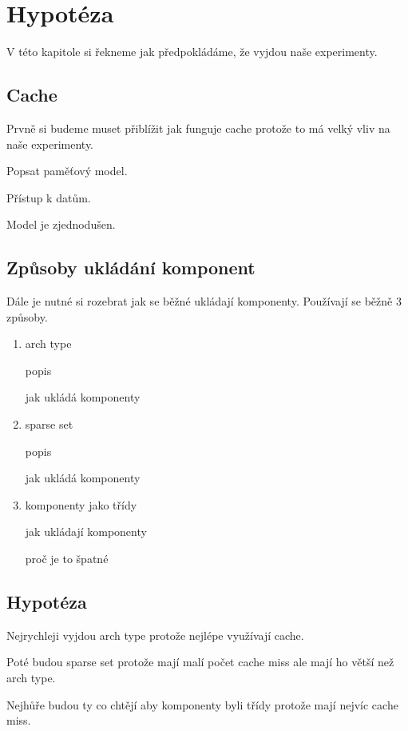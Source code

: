 \chapter{Hypotéza}
\label{chap:hypothesis}
V této kapitole si řekneme jak předpokládáme, že vyjdou naše experimenty.

\section{Cache}
Prvně si budeme muset přiblížit jak funguje cache protože to má velký vliv na naše experimenty.

Popsat paměťový model.

Přístup k datům.

Model je zjednodušen.

\section{Způsoby ukládání komponent}
Dále je nutné si rozebrat jak se běžné ukládají komponenty. Používají se běžně 3 způsoby.

\begin{enumerate}
    \item arch type

    popis

    jak ukládá komponenty
    \item sparse set

    popis

    jak ukládá komponenty

    \item komponenty jako třídy

    jak ukládají komponenty

    proč je to špatné
\end{enumerate}

\section{Hypotéza}
Nejrychleji vyjdou arch type protože nejlépe využívají cache.

Poté budou sparse set protože mají malí počet cache miss ale mají ho větší než arch type.

Nejhůře budou ty co chtějí aby komponenty byli třídy protože mají nejvíc cache miss.






